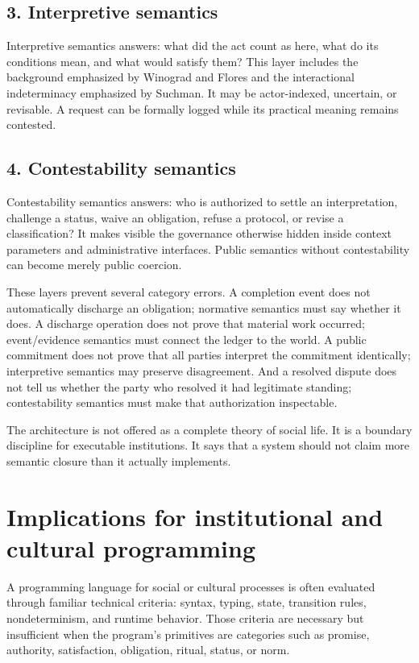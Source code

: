 \documentclass[11pt]{article}
\begin{document}
\subsection*{3. Interpretive semantics}
Interpretive semantics answers: what did the act count as here, what do its conditions mean, and what would satisfy them? This layer includes the background emphasized by Winograd and Flores and the interactional indeterminacy emphasized by Suchman. It may be actor-indexed, uncertain, or revisable. A request can be formally logged while its practical meaning remains contested.

\subsection*{4. Contestability semantics}
Contestability semantics answers: who is authorized to settle an interpretation, challenge a status, waive an obligation, refuse a protocol, or revise a classification? It makes visible the governance otherwise hidden inside context parameters and administrative interfaces. Public semantics without contestability can become merely public coercion.

These layers prevent several category errors. A completion event does not automatically discharge an obligation; normative semantics must say whether it does. A discharge operation does not prove that material work occurred; event/evidence semantics must connect the ledger to the world. A public commitment does not prove that all parties interpret the commitment identically; interpretive semantics may preserve disagreement. And a resolved dispute does not tell us whether the party who resolved it had legitimate standing; contestability semantics must make that authorization inspectable.

The architecture is not offered as a complete theory of social life. It is a boundary discipline for executable institutions. It says that a system should not claim more semantic closure than it actually implements.

\section{Implications for institutional and cultural programming}
A programming language for social or cultural processes is often evaluated through familiar technical criteria: syntax, typing, state, transition rules, nondeterminism, and runtime behavior. Those criteria are necessary but insufficient when the program's primitives are categories such as promise, authority, satisfaction, obligation, ritual, status, or norm.
\end{document}

